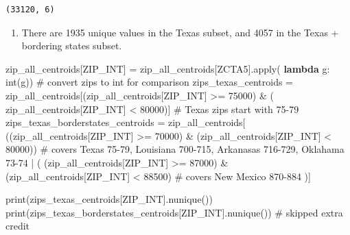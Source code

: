 \documentclass[
  letterpaper,
  DIV=11,
  numbers=noendperiod]{scrartcl}
\newenvironment{Shaded}{\begin{snugshade}}{\end{snugshade}}
\newcommand{\BuiltInTok}[1]{\textcolor[rgb]{0.00,0.23,0.31}{#1}}
\newcommand{\CommentTok}[1]{\textcolor[rgb]{0.37,0.37,0.37}{#1}}
\newcommand{\DecValTok}[1]{\textcolor[rgb]{0.68,0.00,0.00}{#1}}
\newcommand{\KeywordTok}[1]{\textcolor[rgb]{0.00,0.23,0.31}{\textbf{#1}}}
\newcommand{\NormalTok}[1]{\textcolor[rgb]{0.00,0.23,0.31}{#1}}
\newcommand{\OperatorTok}[1]{\textcolor[rgb]{0.37,0.37,0.37}{#1}}
\newcommand{\StringTok}[1]{\textcolor[rgb]{0.13,0.47,0.30}{#1}}
\providecommand{\tightlist}{%
  \setlength{\itemsep}{0pt}\setlength{\parskip}{0pt}}\usepackage{longtable,booktabs,array}
\begin{document}
\begin{verbatim}
(33120, 6)
\end{verbatim}

\begin{enumerate}
\def\labelenumi{\arabic{enumi}.}
\setcounter{enumi}{1}
\tightlist
\item
  There are 1935 unique values in the Texas subset, and 4057 in the
  Texas + bordering states subset.
\end{enumerate}

\begin{Shaded}
\begin{Highlighting}[]
\NormalTok{zip\_all\_centroids[}\StringTok{\textquotesingle{}ZIP\_INT\textquotesingle{}}\NormalTok{] }\OperatorTok{=}\NormalTok{ zip\_all\_centroids[}\StringTok{\textquotesingle{}ZCTA5\textquotesingle{}}\NormalTok{].}\BuiltInTok{apply}\NormalTok{(}
    \KeywordTok{lambda}\NormalTok{ g: }\BuiltInTok{int}\NormalTok{(g))  }\CommentTok{\# convert zips to int for comparison}
\NormalTok{zips\_texas\_centroids }\OperatorTok{=}\NormalTok{ zip\_all\_centroids[(zip\_all\_centroids[}\StringTok{\textquotesingle{}ZIP\_INT\textquotesingle{}}\NormalTok{] }\OperatorTok{\textgreater{}=} \DecValTok{75000}\NormalTok{) }\OperatorTok{\&}\NormalTok{ (}
\NormalTok{    zip\_all\_centroids[}\StringTok{\textquotesingle{}ZIP\_INT\textquotesingle{}}\NormalTok{] }\OperatorTok{\textless{}} \DecValTok{80000}\NormalTok{)]  }\CommentTok{\# Texas zips start with 75{-}79}
\NormalTok{zips\_texas\_borderstates\_centroids }\OperatorTok{=}\NormalTok{ zip\_all\_centroids[}
\NormalTok{    ((zip\_all\_centroids[}\StringTok{\textquotesingle{}ZIP\_INT\textquotesingle{}}\NormalTok{] }\OperatorTok{\textgreater{}=} \DecValTok{70000}\NormalTok{)}
     \OperatorTok{\&}\NormalTok{ (zip\_all\_centroids[}\StringTok{\textquotesingle{}ZIP\_INT\textquotesingle{}}\NormalTok{] }\OperatorTok{\textless{}} \DecValTok{80000}\NormalTok{))     }\CommentTok{\# covers Texas 75{-}79, Louisiana 700{-}715, Arkanasas 716{-}729, Oklahama 73{-}74}
    \OperatorTok{|}\NormalTok{ (}
\NormalTok{        (zip\_all\_centroids[}\StringTok{\textquotesingle{}ZIP\_INT\textquotesingle{}}\NormalTok{] }\OperatorTok{\textgreater{}=} \DecValTok{87000}\NormalTok{)}
         \OperatorTok{\&}\NormalTok{ (zip\_all\_centroids[}\StringTok{\textquotesingle{}ZIP\_INT\textquotesingle{}}\NormalTok{] }\OperatorTok{\textless{}} \DecValTok{88500}\NormalTok{)  }\CommentTok{\# covers New Mexico 870{-}884}
\NormalTok{    )]}

\BuiltInTok{print}\NormalTok{(zips\_texas\_centroids[}\StringTok{\textquotesingle{}ZIP\_INT\textquotesingle{}}\NormalTok{].nunique())}
\BuiltInTok{print}\NormalTok{(zips\_texas\_borderstates\_centroids[}\StringTok{\textquotesingle{}ZIP\_INT\textquotesingle{}}\NormalTok{].nunique())}
\CommentTok{\# skipped extra credit}
\end{Highlighting}
\end{Shaded}
\end{document}
